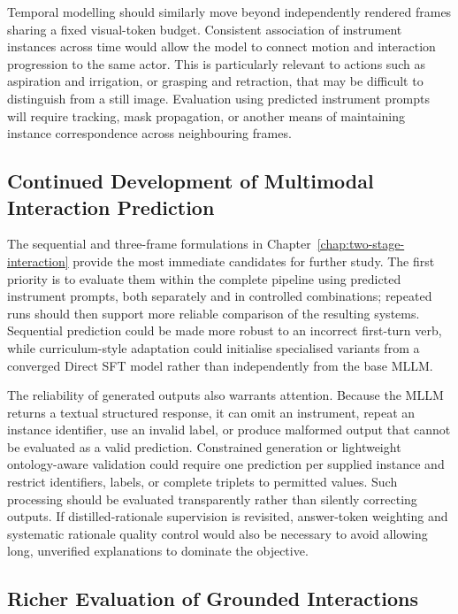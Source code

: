 Temporal modelling should similarly move beyond independently rendered frames sharing a fixed visual-token budget. Consistent association of instrument instances across time would allow the model to connect motion and interaction progression to the same actor. This is particularly relevant to actions such as aspiration and irrigation, or grasping and retraction, that may be difficult to distinguish from a still image. Evaluation using predicted instrument prompts will require tracking, mask propagation, or another means of maintaining instance correspondence across neighbouring frames.

\subsection{Continued Development of Multimodal Interaction Prediction}
\label{sec:discussion-mllm-future}

The sequential and three-frame formulations in Chapter~\ref{chap:two-stage-interaction} provide the most immediate candidates for further study. The first priority is to evaluate them within the complete pipeline using predicted instrument prompts, both separately and in controlled combinations; repeated runs should then support more reliable comparison of the resulting systems. Sequential prediction could be made more robust to an incorrect first-turn verb, while curriculum-style adaptation could initialise specialised variants from a converged Direct SFT model rather than independently from the base MLLM.

The reliability of generated outputs also warrants attention. Because the MLLM returns a textual structured response, it can omit an instrument, repeat an instance identifier, use an invalid label, or produce malformed output that cannot be evaluated as a valid prediction. Constrained generation or lightweight ontology-aware validation could require one prediction per supplied instance and restrict identifiers, labels, or complete triplets to permitted values. Such processing should be evaluated transparently rather than silently correcting outputs. If distilled-rationale supervision is revisited, answer-token weighting and systematic rationale quality control would also be necessary to avoid allowing long, unverified explanations to dominate the objective.

\subsection{Richer Evaluation of Grounded Interactions}
\label{sec:discussion-evaluation-future}

